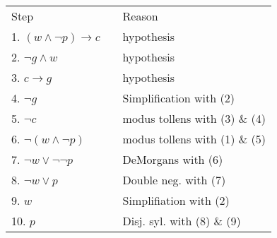 \documentclass[10pt,addpoints]{exam}
\newcommand{\ra}{\rightarrow}
\begin{document}
\begin{questions}
\begin{solution}
        \begin{tabular}{lll}
        Step    & \hspace{0.2in} & Reason \\
        1. $(w \wedge \neg p) \ra c$        & & hypothesis \\
        2. $\neg g \wedge w$                & & hypothesis \\
        3. $c \ra g$                     	& & hypothesis \\
        4. $\neg g$							& & Simplification with (2) \\
        5. $\neg c$							& & modus tollens with (3) \& (4) \\
        6. $\neg (w \wedge \neg p)$			& & modus tollens with (1) \& (5) \\
        7. $\neg w \vee \neg \neg p$			& & DeMorgans with (6) \\
        8. $\neg w \vee p$					& & Double neg. with (7) \\
        9.  $w$								& & Simplifiation with (2) \\
        10. $p$								& & Disj. syl. with (8) \& (9) \\
        \end{tabular}
\end{solution}
    		
\end{questions}
\end{document}
